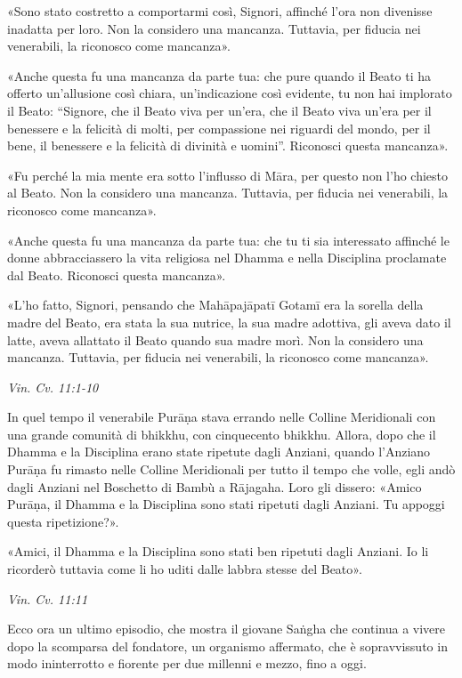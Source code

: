 «Sono stato costretto a comportarmi così, Signori, affinché l’ora non
divenisse inadatta per loro. Non la considero una mancanza. Tuttavia,
per fiducia nei venerabili, la riconosco come mancanza».


«Anche questa fu una mancanza da parte tua: che pure quando il Beato ti
ha offerto un’allusione così chiara, un’indicazione così evidente, tu
non hai implorato il Beato: “Signore, che il Beato viva per un’era, che
il Beato viva un’era per il benessere e la felicità di molti, per
compassione nei riguardi del mondo, per il bene, il benessere e la
felicità di divinità e uomini”. Riconosci questa mancanza».


«Fu perché la mia mente era sotto l’influsso di Māra, per questo non
l’ho chiesto al Beato. Non la considero una mancanza. Tuttavia, per
fiducia nei venerabili, la riconosco come mancanza».


«Anche questa fu una mancanza da parte tua: che tu ti sia interessato
affinché le donne abbracciassero la vita religiosa nel Dhamma e nella
Disciplina proclamate dal Beato. Riconosci questa mancanza».


«L’ho fatto, Signori, pensando che Mahāpajāpatī Gotamī era la sorella
della madre del Beato, era stata la sua nutrice, la sua madre adottiva,
gli aveva dato il latte, aveva allattato il Beato quando sua madre morì.
Non la considero una mancanza. Tuttavia, per fiducia nei venerabili, la
riconosco come mancanza».


\emph{Vin. Cv. 11:1-10}


In quel tempo il venerabile Purāṇa stava errando nelle Colline
Meridionali con una grande comunità di bhikkhu, con cinquecento bhikkhu.
Allora, dopo che il Dhamma e la Disciplina erano state ripetute dagli
Anziani, quando l’Anziano Purāṇa fu rimasto nelle Colline Meridionali
per tutto il tempo che volle, egli andò dagli Anziani nel Boschetto di
Bambù a Rājagaha. Loro gli dissero: «Amico Purāṇa, il Dhamma e la
Disciplina sono stati ripetuti dagli Anziani. Tu appoggi questa
ripetizione?».


«Amici, il Dhamma e la Disciplina sono stati ben ripetuti dagli Anziani.
Io li ricorderò tuttavia come li ho uditi dalle labbra stesse del
Beato».


\emph{Vin. Cv. 11:11}


 Ecco ora un ultimo episodio, che mostra il giovane
Saṅgha che continua a vivere dopo la scomparsa del fondatore, un
organismo affermato, che è sopravvissuto in modo ininterrotto e fiorente
per due millenni e mezzo, fino a oggi.


